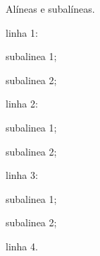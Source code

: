 Alíneas e subalíneas.
\bigskip

\begin{alineas}
\item linha 1:
\begin{alineas}
\item subalinea 1;
\item subalinea 2;
\end{alineas}
\item linha 2:
\begin{subalineas}
\item subalinea 1;
\item subalinea 2;
\end{subalineas}
\item linha 3:
\begin{incisos}
\item subalinea 1;
\item subalinea 2;
\end{incisos}
\item linha 4.
\end{alineas}